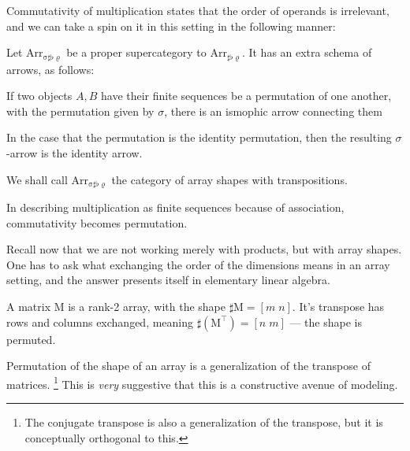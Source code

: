 \documentclass{DIKU-report-variant}
\newcommand\mrm[1]{\mathrm{#1}}
\newcommand\brm[1]{\bm{\mrm{#1}}}
\newcommand\Arr[1]{{\brm{Arr}_{\brm{#1}}}}
\newcommand\SFR{\sharp\flat\varrho}
\newcommand\SSFR{\sigma\sharp\flat\varrho}
\begin{document}
Commutativity of multiplication states that the order of operands is irrelevant,
and we can take a spin on it in this setting in the following manner:

\begin{definition}
  \label{def:category-of-transposes}
  Let \(\Arr{\SSFR}\) be a proper supercategory to \(\Arr\SFR\).
  It has an extra schema of arrows, as follows:

  If two objects \(A, B\) have their finite sequences be
  a permutation of one another, with the permutation given by \(\sigma\),
  there is an ismophic arrow connecting them
  \begin{center}
  \end{center}
  
  In the case that the permutation is the identity permutation, then the
  resulting \(\sigma\)-arrow is the identity arrow.

  \begin{center}
  \end{center}

  We shall call \(\Arr{\SSFR}\) the category of array shapes with transpositions.
\end{definition}

In describing multiplication as finite sequences because of association,
commutativity becomes permutation.

Recall now that we are not working merely with products, but with array
shapes. One has to ask what exchanging the order of the dimensions means in
an array setting, and the answer presents itself in elementary linear algebra.

A matrix \(\brm M\) is a rank-2 array, with the shape \(\sharp \brm M = [m\;n]\).
It's transpose has rows and columns exchanged, meaning \(\sharp( \brm M^\intercal) = [n\;m]\)
--- the shape is permuted.

Permutation of the shape of an array is a generalization of the transpose of matrices.
\footnote{The conjugate transpose is also a generalization of the transpose, but it
is conceptually orthogonal to this.}
This is \emph{very} suggestive that this is a constructive avenue of modeling.
\end{document}
